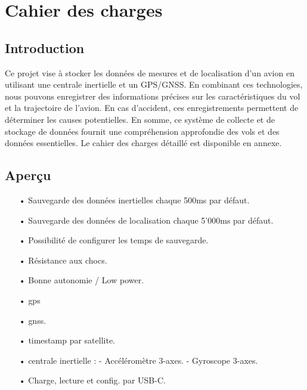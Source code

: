 \section{Cahier des charges}
\noindent
\begin{minipage}[t]{.5\textwidth} %
	\subsection{Introduction}
	Ce projet vise à stocker les données de mesures et de localisation d'un avion en utilisant une centrale inertielle et un GPS/GNSS. En combinant ces technologies, nous pouvons enregistrer des informations précises sur les caractéristiques du vol et la trajectoire de l'avion. En cas d'accident, ces enregistrements permettent de déterminer les causes potentielles. En somme, ce système de collecte et de stockage de données fournit une compréhension approfondie des vols et des données essentielles. Le cahier des charges détaillé est disponible en annexe.
\end{minipage} %
\begin{minipage}[t]{.5\textwidth} %
	\raggedleft
	\subsection{Aperçu}
	\begin{itemize}
		\item[•]	Sauvegarde des données inertielles chaque 500ms par défaut.
		\item[•]	Sauvegarde des données de localisation chaque 5'000ms par défaut.
		\item[•]	Possibilité de configurer les temps de sauvegarde.
		\item[•]	Résistance aux chocs.
		\item[•]	Bonne autonomie / Low power.
		\item[•]	\Gls{gps}
		\item[•]	\Gls{gnss}.
		\item[•]	\Gls{timestamp} par satellite.
		\item[•]	\gls{centrale inertielle} :
		\subitem- 	Accéléromètre 3-axes. 
		\subitem-	Gyroscope 3-axes.
		\item[•] Charge, lecture et config. par USB-C.
	\end{itemize}
\end{minipage}

